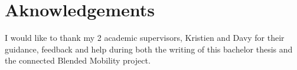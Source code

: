 \chapter*{Aknowledgements}

I would like to thank my 2 academic supervisors, Kristien and Davy for their guidance, feedback and help during both the writing of this bachelor thesis and the connected Blended Mobility project.